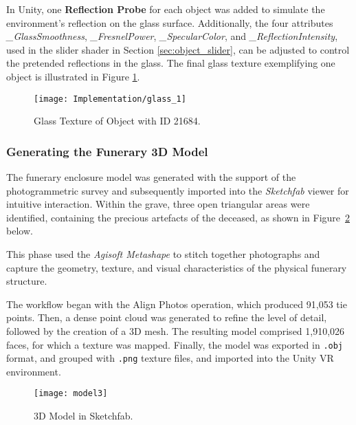In Unity, one \textbf{Reflection Probe} for each object was added to simulate the environment's reflection on the glass surface.
Additionally, the four attributes \emph{\_GlassSmoothness}, \emph{\_FresnelPower}, \emph{\_SpecularColor}, and \emph{\_ReflectionIntensity}, used in the slider shader in Section \ref{sec:object_slider}, can be adjusted to control the pretended reflections in the glass.
The final glass texture exemplifying one object is illustrated in Figure \ref{fig:glass1}.

\begin{figure}[h!]
    \centering
    \texttt{[image: Implementation/glass\_1]}
    \caption{Glass Texture of Object with ID 21684.}
    \label{fig:glass1}
\end{figure}



\subsubsection{Generating the Funerary \gls{3D} Model}
\label{sec:build_model}

The funerary enclosure model was generated with the support of the photogrammetric survey and subsequently imported into the \textit{Sketchfab} viewer for intuitive interaction.
Within the grave, three open triangular areas were identified, containing the precious artefacts of the deceased, as shown in Figure~\ref{fig:model3} below.

This phase used the \textit{Agisoft Metashape} to stitch together photographs and capture the geometry, texture, and visual characteristics of the physical funerary structure.

The workflow began with the Align Photos operation, which produced 91,053 tie points. Then, a dense point cloud was generated to refine the level of detail, followed by the creation of a \gls{3D} mesh. The resulting model comprised 1,910,026 faces, for which a texture was mapped.
Finally, the model was exported in \texttt{.obj} format, and grouped with \texttt{.png} texture files, and imported into the Unity \gls{VR} environment.

\begin{figure}[h!]
    \centering
    \texttt{[image: model3]}
    \caption{\gls{3D} Model in Sketchfab.}
    \label{fig:model3}
\end{figure}

